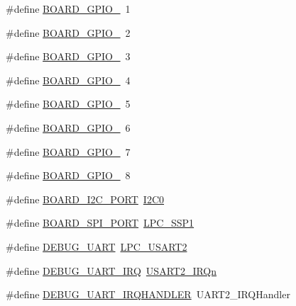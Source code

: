 \begin{DoxyCompactItemize}
\item 
\#define \hyperlink{group__hal_gae683ff8737563bf6e785d0094801c813}{B\+O\+A\+R\+D\+\_\+\+G\+P\+I\+O\+\_}~1
\item 
\#define \hyperlink{group__hal_ga9995c0987882803f480795fcc7378624}{B\+O\+A\+R\+D\+\_\+\+G\+P\+I\+O\+\_}~2
\item 
\#define \hyperlink{group__hal_gabe1edb618549af6a3017541a38b0a379}{B\+O\+A\+R\+D\+\_\+\+G\+P\+I\+O\+\_}~3
\item 
\#define \hyperlink{group__hal_ga2237827fe1cc74f48bb6d467c7d1ec1f}{B\+O\+A\+R\+D\+\_\+\+G\+P\+I\+O\+\_}~4
\item 
\#define \hyperlink{group__hal_ga6b6232587c708ae18d40761da132a639}{B\+O\+A\+R\+D\+\_\+\+G\+P\+I\+O\+\_}~5
\item 
\#define \hyperlink{group__hal_gaaa12b059cf7ab1ceb75ebd0f3d6d2567}{B\+O\+A\+R\+D\+\_\+\+G\+P\+I\+O\+\_}~6
\item 
\#define \hyperlink{group__hal_ga72a3d0e50d2b86db0a58fe0211ceb541}{B\+O\+A\+R\+D\+\_\+\+G\+P\+I\+O\+\_}~7
\item 
\#define \hyperlink{group__hal_ga590b5582ab60d050d19b4db29a542892}{B\+O\+A\+R\+D\+\_\+\+G\+P\+I\+O\+\_}~8
\item 
\#define \hyperlink{group__hal_ga61de281c729ef3680e5e8712056146f7}{B\+O\+A\+R\+D\+\_\+\+I2\+C\+\_\+\+P\+O\+RT}~\hyperlink{i2c__18xx__43xx_8h_gaec46000c6a1fe2c12c9a0c7ee3677626a8b606b29817406621b85b78b1ee9e653}{I2\+C0}
\item 
\#define \hyperlink{group__hal_ga231a44aa9acf60e939bdb959ad620a0f}{B\+O\+A\+R\+D\+\_\+\+S\+P\+I\+\_\+\+P\+O\+RT}~\hyperlink{group___p_e_r_i_p_h__43_x_x___b_a_s_e_ga09c4610ada1d9aa18913963cbd1a6e52}{L\+P\+C\+\_\+\+S\+S\+P1}
\item 
\#define \hyperlink{group__hal_gace21428290f0e412332701391f825a10}{D\+E\+B\+U\+G\+\_\+\+U\+A\+RT}~\hyperlink{group___p_e_r_i_p_h__43_x_x___b_a_s_e_gae6539c90608a0da79ee287639201fc6c}{L\+P\+C\+\_\+\+U\+S\+A\+R\+T2}
\item 
\#define \hyperlink{group__hal_ga753111eb59a5414820fd948b0689054d}{D\+E\+B\+U\+G\+\_\+\+U\+A\+R\+T\+\_\+\+I\+RQ}~\hyperlink{group___c_m_s_i_s__43_x_x___m0___i_r_q_gga402456eb2f4f5b3dc2a53f725eed9485a3f9c48714d0e5baaba6613343f0da68e}{U\+S\+A\+R\+T2\+\_\+\+I\+R\+Qn}
\item 
\#define \hyperlink{group__hal_gab5642720149ac26cffc93c59d3ca23b8}{D\+E\+B\+U\+G\+\_\+\+U\+A\+R\+T\+\_\+\+I\+R\+Q\+H\+A\+N\+D\+L\+ER}~U\+A\+R\+T2\+\_\+\+I\+R\+Q\+Handler
\item 

\end{DoxyCompactItemize}
